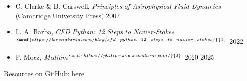 	\begin{frame}
		\begin{center}\textcolor{MASS}{}\end{center}\vspace{2ex}
		\begin{itemize}
			\item C. Clarke \& B. Carswell, {\itshape{Principles of Astrophysical Fluid Dynamics}} (Cambridge University Press) 2007
			\item L. A. Barba, {\itshape{CFD Python: 12 Steps to Navier-Stokes}}$
				  ^{\href{https://lorenabarba.com/blog/cfd-python-12-steps-to-navier-stokes/}{1}}$ 2022
			\item P. Mocz, {\itshape{Medium}}$^{\href{https://philip-mocz.medium.com/}{2}}$ 2020-2025
		\end{itemize}
		\vspace{2ex}
		Resources on GitHub: \href{https://github.com/fritzali/notes/tree/main/MASS/Numerical/test}{here}
	\end{frame}

